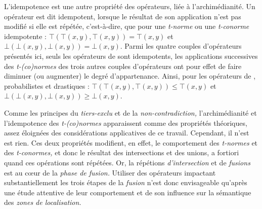 L’idempotence est une autre propriété des opérateurs, liée à
l'archimédianité. Un opérateur est dit idempotent, lorsque le résultat
de son application n'est pas modifié si elle est répétée,
c'est-à-dire, que pour une \emph{t-norme} ou une \emph{t-conorme}
idempotente : \(⊤(⊤(x,y), ⊤(x,y)) = ⊤(x,y)\) et
\(⊥(⊥(x,y),⊥(x,y)) = ⊥(x,y)\). Parmi les quatre couples d'opérateurs
présentés ici, seuls les opérateurs de  sont idempotents,
les applications successives des \emph{t-(co)normes} des trois autres
couples d'opérateurs ont pour effet de faire diminuer (ou augmenter)
le degré d'appartenance. Ainsi, pour les opérateurs de
, probabilistes et drastiques :
\(⊤(⊤(x,y), ⊤(x,y)) ≤ ⊤(x,y)\) et \(⊥(⊥(x,y),⊥(x,y)) ≥ ⊥(x,y)\).

Comme les principes du \emph{tiers-exclu} et de la
\emph{non-contradiction,} l'archimédianité et l'idempotence des
\emph{t-(co)normes} apparaissent comme des propriétés théoriques,
assez éloignées des considérations applicatives de ce
travail. Cependant, il n'est est rien. Ces deux propriétés modifient,
en effet, le comportement des \emph{t-normes} et des
\emph{t-conormes,} et donc le résultat des intersections et des
unions, a fortiori quand ces opérations sont répétées. Or, la
répétions \emph{d'intersection} et de \emph{fusions} est au cœur de la
\emph{phase de fusion.} Utiliser des opérateurs impactant
substantiellement les trois étapes de la \emph{fusion} n'est donc
envisageable qu'après une étude attentive de leur comportement et de
son influence sur la sémantique des \emph{zones de localisation.}



